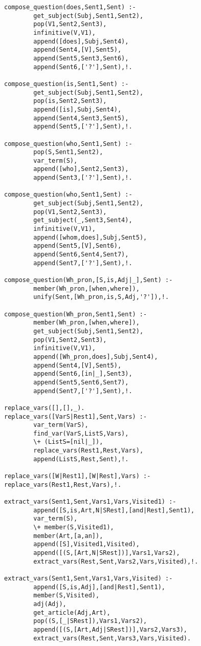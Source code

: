 \begin{verbatim}
compose_question(does,Sent1,Sent) :-
        get_subject(Subj,Sent1,Sent2),
        pop(V1,Sent2,Sent3),
        infinitive(V,V1),
        append([does],Subj,Sent4),
        append(Sent4,[V],Sent5),
        append(Sent5,Sent3,Sent6),
        append(Sent6,['?'],Sent),!.

compose_question(is,Sent1,Sent) :-
        get_subject(Subj,Sent1,Sent2),
        pop(is,Sent2,Sent3),
        append([is],Subj,Sent4),
        append(Sent4,Sent3,Sent5),
        append(Sent5,['?'],Sent),!.

compose_question(who,Sent1,Sent) :-
        pop(S,Sent1,Sent2),
        var_term(S),
        append([who],Sent2,Sent3),
        append(Sent3,['?'],Sent),!.

compose_question(who,Sent1,Sent) :-
        get_subject(Subj,Sent1,Sent2),
        pop(V1,Sent2,Sent3),
        get_subject(_,Sent3,Sent4),
        infinitive(V,V1),
        append([whom,does],Subj,Sent5),
        append(Sent5,[V],Sent6),
        append(Sent6,Sent4,Sent7),
        append(Sent7,['?'],Sent),!.

compose_question(Wh_pron,[S,is,Adj|_],Sent) :-
        member(Wh_pron,[when,where]),
        unify(Sent,[Wh_pron,is,S,Adj,'?']),!.

compose_question(Wh_pron,Sent1,Sent) :-
        member(Wh_pron,[when,where]),
        get_subject(Subj,Sent1,Sent2),
        pop(V1,Sent2,Sent3),
        infinitive(V,V1),
        append([Wh_pron,does],Subj,Sent4),
        append(Sent4,[V],Sent5),
        append(Sent6,[in|_],Sent3),
        append(Sent5,Sent6,Sent7),
        append(Sent7,['?'],Sent),!.

replace_vars([],[],_).
replace_vars([VarS|Rest1],Sent,Vars) :-
        var_term(VarS),
        find_var(VarS,ListS,Vars),
        \+ (ListS=[nil|_]),
        replace_vars(Rest1,Rest,Vars),
        append(ListS,Rest,Sent),!.

replace_vars([W|Rest1],[W|Rest],Vars) :- replace_vars(Rest1,Rest,Vars),!.

extract_vars(Sent1,Sent,Vars1,Vars,Visited1) :-
        append([S,is,Art,N|SRest],[and|Rest],Sent1),
        var_term(S),
        \+ member(S,Visited1),
        member(Art,[a,an]),
        append([S],Visited1,Visited),
        append([(S,[Art,N|SRest])],Vars1,Vars2),
        extract_vars(Rest,Sent,Vars2,Vars,Visited),!.

extract_vars(Sent1,Sent,Vars1,Vars,Visited) :-
        append([S,is,Adj],[and|Rest],Sent1),
        member(S,Visited),
        adj(Adj),
        get_article(Adj,Art),
        pop((S,[_|SRest]),Vars1,Vars2),
        append([(S,[Art,Adj|SRest])],Vars2,Vars3),
        extract_vars(Rest,Sent,Vars3,Vars,Visited).


\end{verbatim}
